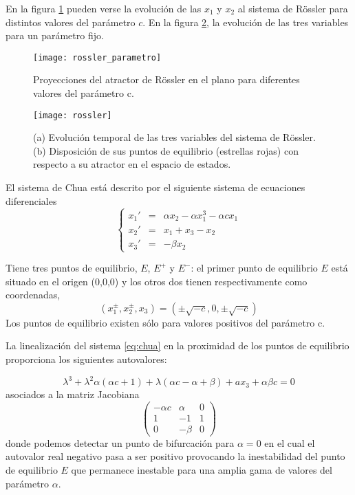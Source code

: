 En la figura \ref{fig:rossler_parametro} pueden verse la evolución de las $x_1$ y $x_2$ al sistema de Rössler para distintos valores del parámetro $c$.
En la figura \ref{fig:rossler}, la evolución de las tres variables para un parámetro fijo.
%
\begin{figure}
\centering\texttt{[image: rossler\_parametro]}
\caption{Proyecciones del atractor de Rössler en el plano  para diferentes valores del parámetro c.}
\label{fig:rossler_parametro}
\end{figure}
%
\begin{figure}
\centering\texttt{[image: rossler]}
\caption{(a) Evolución temporal de las tres variables del sistema de Rössler. (b) Disposición de sus puntos de equilibrio (estrellas rojas) con respecto a su atractor en el espacio de estados.}
\label{fig:rossler}
\end{figure}

El sistema de Chua está descrito por el siguiente sistema de ecuaciones diferenciales
\begin{equation}\label{eq:chua}
\left \{
\begin{array}{rcl}
x_1' &=& \alpha x_2- \alpha x_1^3- \alpha c x_1\\
x_2' &=& x_1 + x_3 - x_2\\
x_3' &=& -\beta x_2
\end{array}
\right.
\end{equation}

Tiene tres puntos de equilibrio, $E$, $E^+$ y $E^-$: el primer punto de equilibrio $E$ está situado en el origen (0,0,0) y los otros dos tienen respectivamente como coordenadas,
\begin{equation}
(x_1^\pm,x_2^\pm,x_3)=\left(\pm \sqrt{-c}, 0,\pm \sqrt{-c}\right) \nonumber
\end{equation}
Los puntos de equilibrio existen sólo para valores positivos del parámetro c.

La linealización del sistema \ref{eq:chua} en la proximidad de los puntos de equilibrio proporciona los siguientes autovalores:

\begin{equation}
\lambda^3 + \lambda^2 \alpha (\alpha c+1)+\lambda(\alpha c-\alpha+\beta)+ax_3+\alpha\beta c=0 \nonumber
\end{equation}
asociados a la matriz Jacobiana
\begin{equation}
\begin{pmatrix}
-\alpha c &\alpha &0 \\
1 &-1 &1 \\
0 &-\beta &0
\end{pmatrix}
\nonumber
\end{equation}
donde podemos detectar un punto de bifurcación para $\alpha=0$ en el cual el autovalor real negativo pasa a ser positivo provocando la inestabilidad del punto de equilibrio $E$ que permanece inestable para una amplia gama de valores del parámetro $\alpha$.

